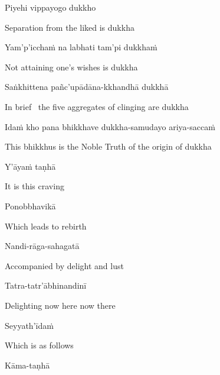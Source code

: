 Piyehi vippayogo dukkho

\begin{english}
  Separation from the liked is dukkha
\end{english}

Yam'p'icchaṁ na labhati tam'pi dukkhaṁ

\begin{english}
  Not attaining one's wishes is dukkha
\end{english}

Saṅkhittena pañc'upādāna-kkhandhā dukkhā

\begin{english}
  In brief \breathmark\ the five aggregates of clinging are dukkha\ifdigitalversion\makeatletter\hyperlink{endnote54-appendix}\makeatother\fi
\end{english}

Idaṁ kho pana bhikkhave dukkha-samudayo ariya-saccaṁ

\begin{english}
  This bhikkhus is the Noble Truth of the origin of dukkha
\end{english}

Y'āyaṁ taṇhā

\begin{english}
  It is this craving
\end{english}

Ponobbhavikā

\begin{english}
  Which leads to rebirth
\end{english}

Nandi-rāga-sahagatā

\begin{english}
  Accompanied by delight and lust
\end{english}

Tatra-tatr'ābhinandinī

\begin{english}
  Delighting now here now there
\end{english}

Seyyath'īdaṁ

\begin{english}
  Which is as follows
\end{english}

Kāma-taṇhā

